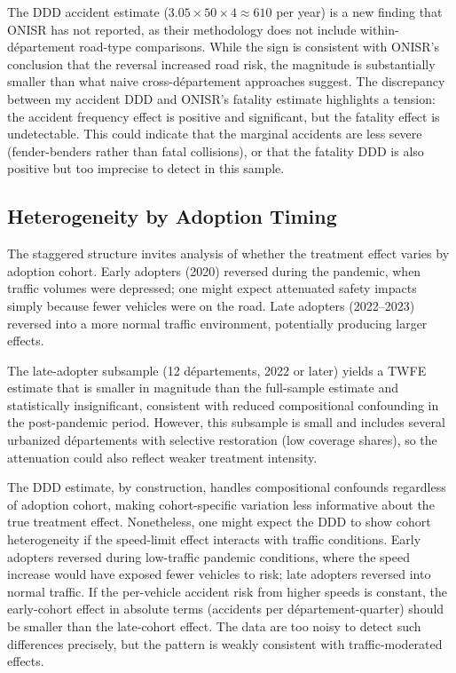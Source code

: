 \documentclass[12pt]{article}
\begin{document}
The DDD accident estimate ($3.05 \times 50 \times 4 \approx 610$ per year) is a new finding that ONISR has not reported, as their methodology does not include within-d\'{e}partement road-type comparisons. While the sign is consistent with ONISR's conclusion that the reversal increased road risk, the magnitude is substantially smaller than what naive cross-d\'{e}partement approaches suggest. The discrepancy between my accident DDD and ONISR's fatality estimate highlights a tension: the accident frequency effect is positive and significant, but the fatality effect is undetectable. This could indicate that the marginal accidents are less severe (fender-benders rather than fatal collisions), or that the fatality DDD is also positive but too imprecise to detect in this sample.

\subsection{Heterogeneity by Adoption Timing}

The staggered structure invites analysis of whether the treatment effect varies by adoption cohort. Early adopters (2020) reversed during the pandemic, when traffic volumes were depressed; one might expect attenuated safety impacts simply because fewer vehicles were on the road. Late adopters (2022--2023) reversed into a more normal traffic environment, potentially producing larger effects.

The late-adopter subsample (12 d\'{e}partements, 2022 or later) yields a TWFE estimate that is smaller in magnitude than the full-sample estimate and statistically insignificant, consistent with reduced compositional confounding in the post-pandemic period. However, this subsample is small and includes several urbanized d\'{e}partements with selective restoration (low coverage shares), so the attenuation could also reflect weaker treatment intensity.

The DDD estimate, by construction, handles compositional confounds regardless of adoption cohort, making cohort-specific variation less informative about the true treatment effect. Nonetheless, one might expect the DDD to show cohort heterogeneity if the speed-limit effect interacts with traffic conditions. Early adopters reversed during low-traffic pandemic conditions, where the speed increase would have exposed fewer vehicles to risk; late adopters reversed into normal traffic. If the per-vehicle accident risk from higher speeds is constant, the early-cohort effect in absolute terms (accidents per d\'{e}partement-quarter) should be smaller than the late-cohort effect. The data are too noisy to detect such differences precisely, but the pattern is weakly consistent with traffic-moderated effects.
\end{document}
